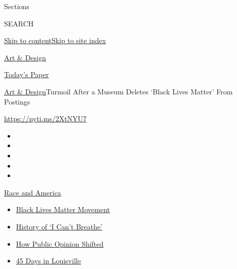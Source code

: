 Sections

SEARCH

\protect\hyperlink{site-content}{Skip to
content}\protect\hyperlink{site-index}{Skip to site index}

\href{https://www.nytimes.com/section/arts/design}{Art \& Design}

\href{https://myaccount.nytimes.com/auth/login?response_type=cookie\&client_id=vi}{}

\href{https://www.nytimes.com/section/todayspaper}{Today's Paper}

\href{/section/arts/design}{Art \& Design}\textbar{}Turmoil After a
Museum Deletes `Black Lives Matter' From Postings

\url{https://nyti.ms/2XtNYU7}

\begin{itemize}
\item
\item
\item
\item
\item
\end{itemize}

\href{https://www.nytimes.com/news-event/george-floyd-protests-minneapolis-new-york-los-angeles?action=click\&pgtype=Article\&state=default\&region=TOP_BANNER\&context=storylines_menu}{Race
and America}

\begin{itemize}
\tightlist
\item
  \href{https://www.nytimes.com/interactive/2020/07/03/us/george-floyd-protests-crowd-size.html?action=click\&pgtype=Article\&state=default\&region=TOP_BANNER\&context=storylines_menu}{Black
  Lives Matter Movement}
\item
  \href{https://www.nytimes.com/interactive/2020/06/28/us/i-cant-breathe-police-arrest.html?action=click\&pgtype=Article\&state=default\&region=TOP_BANNER\&context=storylines_menu}{History
  of `I Can't Breathe'}
\item
  \href{https://www.nytimes.com/interactive/2020/06/10/upshot/black-lives-matter-attitudes.html?action=click\&pgtype=Article\&state=default\&region=TOP_BANNER\&context=storylines_menu}{How
  Public Opinion Shifted}
\item
  \href{https://www.nytimes.com/interactive/2020/07/16/us/black-lives-matter-protests-louisville-breonna-taylor.html?action=click\&pgtype=Article\&state=default\&region=TOP_BANNER\&context=storylines_menu}{45
  Days in Louisville}
\end{itemize}

